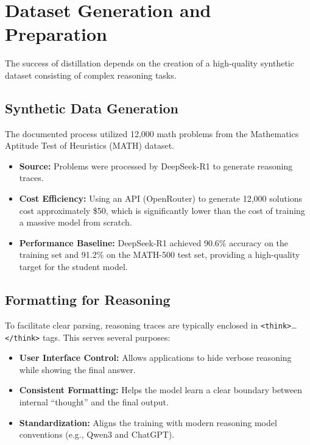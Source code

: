 \section{Dataset Generation and Preparation}
\label{sec:future-directions}


The success of distillation depends on the creation of a high-quality synthetic dataset consisting of complex reasoning tasks.

\subsection{Synthetic Data Generation}

The documented process utilized 12,000 math problems from the Mathematics Aptitude Test of Heuristics (MATH) dataset.

\begin{itemize}
    \item \textbf{Source:} Problems were processed by DeepSeek-R1 to generate reasoning traces.
    \item \textbf{Cost Efficiency:} Using an API (OpenRouter) to generate 12,000 solutions cost approximately \$50, which is significantly lower than the cost of training a massive model from scratch.
    \item \textbf{Performance Baseline:} DeepSeek-R1 achieved 90.6\% accuracy on the training set and 91.2\% on the MATH-500 test set, providing a high-quality target for the student model.
\end{itemize}

\subsection{Formatting for Reasoning}

To facilitate clear parsing, reasoning traces are typically enclosed in \texttt{<think>}\ldots\texttt{</think>} tags. This serves several purposes:

\begin{itemize}
    \item \textbf{User Interface Control:} Allows applications to hide verbose reasoning while showing the final answer.
    \item \textbf{Consistent Formatting:} Helps the model learn a clear boundary between internal ``thought'' and the final output.
    \item \textbf{Standardization:} Aligns the training with modern reasoning model conventions (e.g., Qwen3 and ChatGPT).
\end{itemize}
